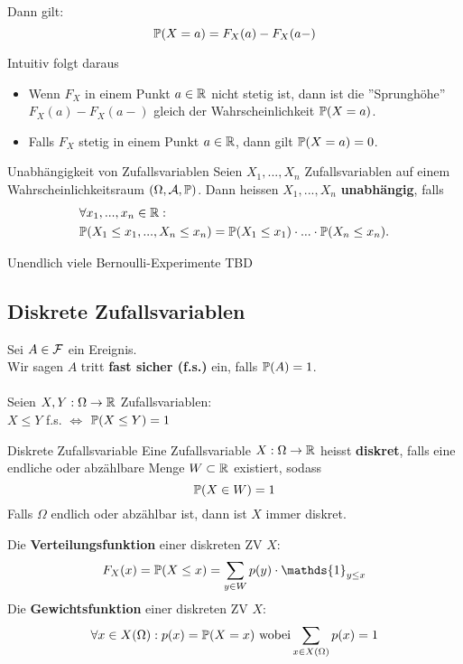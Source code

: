 Dann gilt:
$$\P(X = a) = F_X(a) - F_X(a-)$$

Intuitiv folgt daraus
\begin{itemize}
    \item Wenn $F_X$ in einem Punkt $a \in \R$ nicht stetig ist, dann ist die ''Sprunghöhe'' $F_X(a)-F_X(a-)$ gleich der Wahrscheinlichkeit $\P(X = a)$.
    \item Falls $F_X$ stetig in einem Punkt $a \in \R$, dann gilt $\P(X = a) = 0$. 
\end{itemize}

\begin{mainbox}{Unabhängigkeit von Zufallsvariablen}
    Seien $X_1, ...,X_n$ Zufallsvariablen auf einem Wahrscheinlichkeitsraum $(\Omega, \A, \P)$. Dann heissen $X_1, ...,X_n$ \textbf{unabhängig}, falls
    \begin{align*}
        &\forall x_1, ..., x_n \in \R:\\
        &\P(X_1 \leq x_1, ..., X_n \leq x_n) = \P(X_1 \leq x_1)\cdot ... \cdot \P(X_n \leq x_n).
    \end{align*} 
\end{mainbox}

\begin{subbox}{Unendlich viele Bernoulli-Experimente}
    TBD
\end{subbox}

\subsection{Diskrete Zufallsvariablen}
Sei $A \in \F$ ein Ereignis. \\
Wir sagen $A$ tritt \textbf{fast sicher (f.s.)} ein, falls $\P(A)= 1$.
\\ \\
Seien $X, Y: \Omega \to \R$ Zufallsvariablen: \\$X \leq Y$ f.s. $\iff$ $\P(X \leq Y)=1$


\begin{mainbox}{Diskrete Zufallsvariable}
    Eine Zufallsvariable $X: \Omega \to \R$ heisst \textbf{diskret}, falls eine endliche oder abzählbare Menge $W \subset \R$ existiert, sodass
    $$\P(X \in W) = 1$$
    Falls $\Omega$ endlich oder abzählbar ist, dann ist $X$ immer diskret.
\end{mainbox}
Die \textbf{Verteilungsfunktion} einer diskreten ZV $X$: $$F_X(x)= \P(X \leq x)= \sum_{y\in W}p(y)\cdot \mathds{1}_{y\leq x}$$
Die \textbf{Gewichtsfunktion} einer diskreten ZV $X$: $$\forall x \in X(\Omega): p(x)= \P(X=x) \text{ wobei} \sum_{x \in X(\Omega)}p(x)= 1$$

